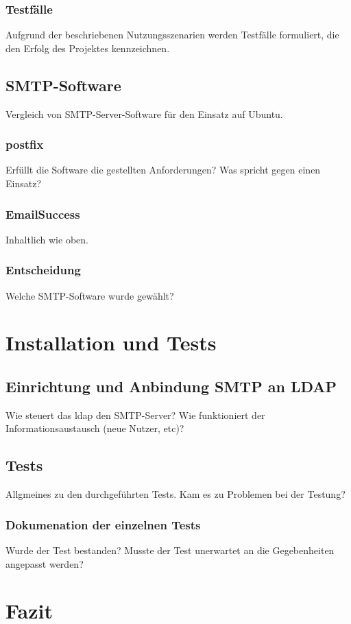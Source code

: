 \subsection{Testfälle}
Aufgrund der beschriebenen Nutzungsszenarien werden Testfälle formuliert, die den Erfolg des Projektes kennzeichnen. 

\section{SMTP-Software}
Vergleich von SMTP-Server-Software für den Einsatz auf Ubuntu. 
\subsection{postfix}
Erfüllt die Software die gestellten Anforderungen? Was spricht gegen einen Einsatz?
\subsection{EmailSuccess}
Inhaltlich wie oben.

\subsection{Entscheidung}
Welche SMTP-Software wurde gewählt? 

\chapter{Installation und Tests}

\section{Einrichtung und Anbindung SMTP an LDAP}
Wie steuert das \ac{ldap} den SMTP-Server? Wie funktioniert der Informationsaustausch (neue Nutzer, etc)?

\section{Tests}
Allgmeines zu den durchgeführten Tests. Kam es zu Problemen bei der Testung?
\subsection{Dokumenation der einzelnen Tests}
Wurde der Test bestanden? Musste der Test unerwartet an die Gegebenheiten angepasst werden?

\chapter{Fazit}

\blindtext
